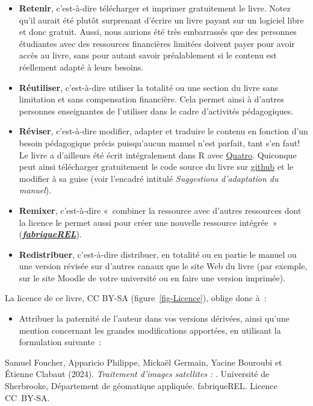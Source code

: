 \documentclass[
  11pt,
  letterpaper,
  open=any,
  twoside=false,
  french]{scrbook}
\providecommand{\tightlist}{%
  \setlength{\itemsep}{0pt}\setlength{\parskip}{0pt}}\usepackage{longtable,booktabs,array}
\begin{document}
\begin{itemize}
\item
  \textbf{Retenir}, c'est-à-dire télécharger et imprimer gratuitement le
  livre. Notez qu'il aurait été plutôt surprenant d'écrire un livre
  payant sur un logiciel libre et donc gratuit. Aussi, nous aurions été
  très embarrassés que des personnes étudiantes avec des ressources
  financières limitées doivent payer pour avoir accès au livre, sans
  pour autant savoir préalablement si le contenu est réellement adapté à
  leurs besoins.
\item
  \textbf{Réutiliser}, c'est-à-dire utiliser la totalité ou une section
  du livre sans limitation et sans compensation financière. Cela permet
  ainsi à d'autres personnes enseignantes de l'utiliser dans le cadre
  d'activités pédagogiques.
\item
  \textbf{Réviser}, c'est-à-dire modifier, adapter et traduire le
  contenu en fonction d'un besoin pédagogique précis puisqu'aucun manuel
  n'est parfait, tant s'en faut! Le livre a d'ailleurs été écrit
  intégralement dans R avec \href{https://quarto.org/}{Quatro}.
  Quiconque peut ainsi télécharger gratuitement le code source du livre
  sur
  \href{https://github.com/SerieBoldR/MethodesAnalyseSpatiale}{github}
  et le modifier à sa guise (voir l'encadré intitulé \emph{Suggestions
  d'adaptation du manuel}).
\item
  \textbf{Remixer}, c'est-à-dire «~combiner la ressource avec d'autres
  ressources dont la licence le permet aussi pour créer une nouvelle
  ressource intégrée~»
  (\href{https://fabriquerel.org/rel/}{\textbf{\emph{fabriqueREL}}}).
\item
  \textbf{Redistribuer}, c'est-à-dire distribuer, en totalité ou en
  partie le manuel ou une version révisée sur d'autres canaux que le
  site Web du livre (par exemple, sur le site Moodle de votre université
  ou en faire une version imprimée).
\end{itemize}

La licence de ce livre, CC BY-SA (figure~\ref{fig-Licence}), oblige donc
à~:

\begin{itemize}
\tightlist
\item
  Attribuer la paternité de l'auteur dans vos versions dérivées, ainsi
  qu'une mention concernant les grandes modifications apportées, en
  utilisant la formulation suivante~:
\end{itemize}

Samuel Foucher, Apparicio Philippe, Mickaël Germain, Yacine Bouroubi et
Étienne Clabaut (2024). \emph{Traitement d'images satellites : }.
Université de Sherbrooke, Département de géomatique appliquée.
fabriqueREL. Licence CC~BY-SA.
\end{document}
